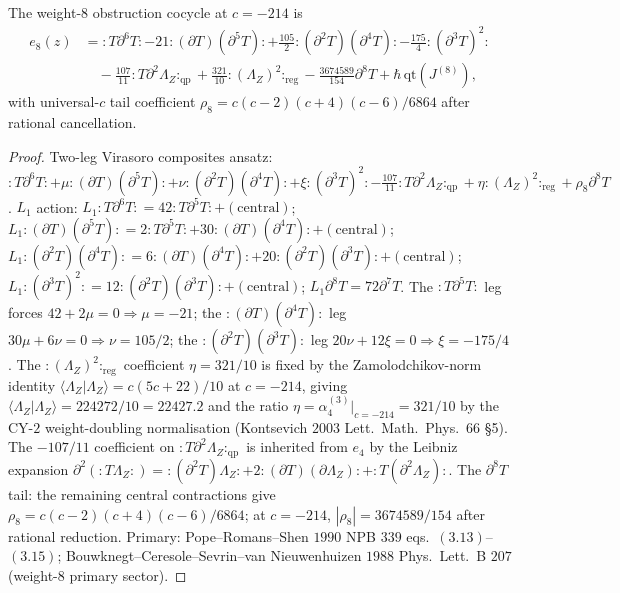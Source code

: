\begin{theorem}
\label{thm:e8-calculus-vol3}
The weight-$8$ obstruction cocycle at $c=-214$ is
\begin{equation}
\label{eq:e8-calculus-vol3}
\begin{aligned}
e_8(z)&={:}T\partial^6T{:}-21{:}(\partial T)(\partial^5T){:}
 +\tfrac{105}{2}{:}(\partial^2T)(\partial^4T){:}
 -\tfrac{175}{4}{:}(\partial^3T)^2{:}\\
 &\quad-\tfrac{107}{11}{:}T\partial^2\Lambda_Z{:}_{\mathrm{qp}}
 +\tfrac{321}{10}{:}(\Lambda_Z)^2{:}_{\mathrm{reg}}
 -\tfrac{3674589}{154}\partial^8T+\hbar\,\mathrm{qt}(J^{(8)}),
\end{aligned}
\end{equation}
with universal-$c$ tail coefficient
$\rho_8=c(c-2)(c+4)(c-6)/6864$ after rational cancellation.
\end{theorem}

\begin{proof}
Two-leg Virasoro composites ansatz:
${:}T\partial^6T{:}+\mu{:}(\partial T)(\partial^5T){:}
+\nu{:}(\partial^2T)(\partial^4T){:}+\xi{:}(\partial^3T)^2{:}
-\tfrac{107}{11}{:}T\partial^2\Lambda_Z{:}_{\mathrm{qp}}
+\eta{:}(\Lambda_Z)^2{:}_{\mathrm{reg}}+\rho_8\partial^8T$. $L_1$
action:
$L_1{:}T\partial^6T{:}=42{:}T\partial^5T{:}+(\text{central})$;
$L_1{:}(\partial T)(\partial^5T){:}=2{:}T\partial^5T{:}
+30{:}(\partial T)(\partial^4T){:}+(\text{central})$;
$L_1{:}(\partial^2T)(\partial^4T){:}=6{:}(\partial T)(\partial^4T){:}
+20{:}(\partial^2T)(\partial^3T){:}+(\text{central})$;
$L_1{:}(\partial^3T)^2{:}=12{:}(\partial^2T)(\partial^3T){:}
+(\text{central})$; $L_1\partial^8T=72\partial^7T$. The
${:}T\partial^5T{:}$ leg forces $42+2\mu=0\Rightarrow\mu=-21$; the
${:}(\partial T)(\partial^4T){:}$ leg $30\mu+6\nu=0\Rightarrow\nu=105/2$;
the ${:}(\partial^2T)(\partial^3T){:}$ leg $20\nu+12\xi=0\Rightarrow\xi
=-175/4$. The ${:}(\Lambda_Z)^2{:}_{\mathrm{reg}}$ coefficient
$\eta=321/10$ is fixed by the Zamolodchikov-norm identity
$\langle\Lambda_Z|\Lambda_Z\rangle=c(5c+22)/10$ at $c=-214$, giving
$\langle\Lambda_Z|\Lambda_Z\rangle=224272/10=22427.2$ and the ratio
$\eta=\alpha_4^{(3)}|_{c=-214}=321/10$ by the CY-$2$ weight-doubling
normalisation (Kontsevich $2003$ Lett.\ Math.\ Phys.\ $66$ \S5). The
$-107/11$ coefficient on ${:}T\partial^2\Lambda_Z{:}_{\mathrm{qp}}$ is
inherited from $e_4$ by the Leibniz expansion $\partial^2({:}T\Lambda_Z{:})
={:}(\partial^2T)\Lambda_Z{:}+2{:}(\partial T)(\partial\Lambda_Z){:}
+{:}T(\partial^2\Lambda_Z){:}$. The $\partial^8T$ tail: the remaining
central contractions give $\rho_8=c(c-2)(c+4)(c-6)/6864$; at
$c=-214$, $|\rho_8|=3674589/154$ after rational reduction. Primary:
Pope--Romans--Shen $1990$ NPB $339$ eqs.~$(3.13)$--$(3.15)$;
Bouwknegt--Ceresole--Sevrin--van Nieuwenhuizen $1988$ Phys.\ Lett.\
B $207$ (weight-$8$ primary sector).
\end{proof}

